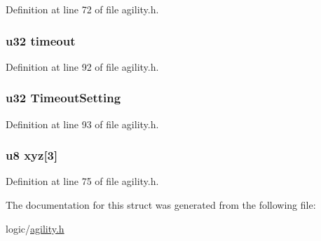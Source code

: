\-Definition at line 72 of file agility.\-h.

\hypertarget{structagil_aab0b8a4320e771becf663b000c2cd7e1}{
\subsubsection[{timeout}]{\setlength{\rightskip}{0pt plus 5cm}u32 {\bf timeout}}}\label{structagil_aab0b8a4320e771becf663b000c2cd7e1}


\-Definition at line 92 of file agility.\-h.

\hypertarget{structagil_a20960b675c12b40c0761d99bd95661c8}{
\subsubsection[{\-Timeout\-Setting}]{\setlength{\rightskip}{0pt plus 5cm}u32 {\bf \-Timeout\-Setting}}}\label{structagil_a20960b675c12b40c0761d99bd95661c8}


\-Definition at line 93 of file agility.\-h.

\hypertarget{structagil_af9cba48daaf1e24eb2df884547c0efcc}{
\subsubsection[{xyz}]{\setlength{\rightskip}{0pt plus 5cm}u8 {\bf xyz}\mbox{[}3\mbox{]}}}\label{structagil_af9cba48daaf1e24eb2df884547c0efcc}


\-Definition at line 75 of file agility.\-h.



\-The documentation for this struct was generated from the following file\-:\begin{DoxyCompactItemize}
\item 
logic/\hyperlink{agility_8h}{agility.\-h}\end{DoxyCompactItemize}
